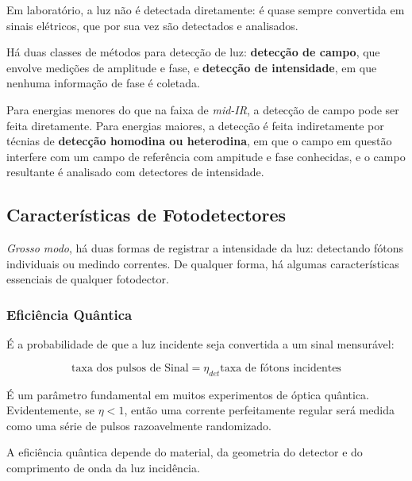 

\begin{displayquote}
    Em laboratório, a luz não é detectada diretamente: é quase sempre convertida em sinais elétricos, que por sua vez são detectados e analisados.
\end{displayquote}

Há duas classes de métodos para detecção de luz: \textbf{detecção de campo}, que envolve medições de amplitude e fase, e \textbf{detecção de intensidade}, em que nenhuma informação de fase é coletada.

Para energias menores do que na faixa de \textit{mid-IR}, a detecção de campo pode ser feita diretamente. Para energias maiores, a detecção é feita indiretamente por técnias de \textbf{detecção homodina ou heterodina}, em que o campo em questão interfere com um campo de referência com ampitude e fase conhecidas, e o campo resultante é analisado com detectores de intensidade.

\subsection{Características de Fotodetectores}

\textit{Grosso modo}, há duas formas de registrar a intensidade da luz: detectando fótons individuais ou medindo correntes. De qualquer forma, há algumas características essenciais de qualquer fotodector.

\subsubsection{Eficiência Quântica}

É a probabilidade de que a luz incidente seja convertida a um sinal mensurável:

\begin{equation}
    \text{taxa dos pulsos de Sinal}=\eta_{det}\text{taxa de fótons incidentes}
\end{equation}

É um parâmetro fundamental em muitos experimentos de óptica quântica. Evidentemente, se $\eta<1$, então uma corrente perfeitamente regular será medida como uma série de pulsos razoavelmente randomizado.

A eficiência quântica depende do material, da geometria do detector e do comprimento de onda da luz incidência.

